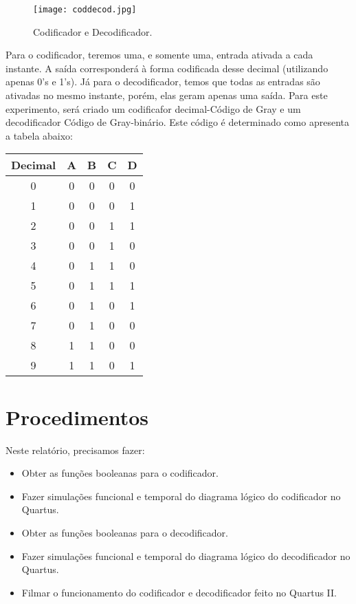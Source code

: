 \documentclass[12pt]{article}
\begin{document}
\begin{figure}[H]
	\centering
	\texttt{[image: coddecod.jpg]}
	\caption{Codificador e Decodificador.}
	\label{fig:coddecod}
\end{figure}


Para o codificador, teremos uma, e somente uma, entrada ativada a cada instante. A saída corresponderá à forma codificada desse decimal (utilizando apenas 0’s e 1’s). Já para o decodificador, temos que todas as entradas são ativadas no mesmo instante, porém, elas geram apenas uma saída. 
Para este experimento, será criado um codificafor decimal-Código de Gray e um decodificador Código de Gray-binário. Este código é determinado como apresenta a tabela abaixo:

\begin{table}[H]
	\centering
	\begin{tabular}{|c|c|c|c|c|}
		\cline{1-5}
		\multicolumn{1}{|c|}{Decimal} & \multicolumn{1}{|c|}{A} & \multicolumn{1}{|c|}{B} & \multicolumn{1}{|c|}{C} & \multicolumn{1}{|c|}{D}\\
		\hline
		0 & 0 & 0 & 0 & 0 \\
		\hline
		1 & 0 & 0 & 0 & 1 \\
		\hline
		2 & 0 & 0 & 1 & 1 \\
		\hline
		3 & 0 & 0 & 1 & 0 \\
		\hline
		4 & 0 & 1 & 1 & 0 \\
		\hline
		5 & 0 & 1 & 1 & 1 \\
		\hline
		6 & 0 & 1 & 0 & 1 \\
		\hline
		7 & 0 & 1 & 0 & 0 \\
		\hline
		8 & 1 & 1 & 0 & 0 \\
		\hline
		9 & 1 & 1 & 0 & 1 \\
		\hline
	\end{tabular}
	
\end{table} 




\section{Procedimentos}
\label{sec:Procedimentos}

Neste relatório, precisamos fazer:
\begin{itemize}
	\item Obter as funções booleanas para o codificador.
	\item Fazer simulações funcional e temporal do diagrama lógico do codificador no Quartus. 
	\item Obter as funções booleanas para o decodificador.
	\item Fazer simulações funcional e temporal do diagrama lógico do decodificador no Quartus. 
	\item Filmar o funcionamento do codificador e decodificador feito no Quartus II.
\end{itemize}
\end{document}
